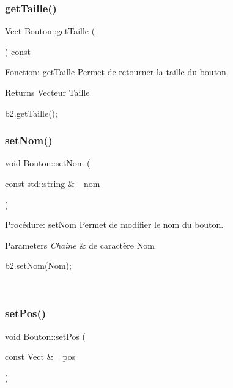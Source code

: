 \subsubsection{\texorpdfstring{get\+Taille()}{getTaille()}}
{\footnotesize\ttfamily \hyperlink{classVect}{Vect} Bouton\+::get\+Taille (\begin{DoxyParamCaption}{ }\end{DoxyParamCaption}) const}



Fonction\+: get\+Taille Permet de retourner la taille du bouton. 

\begin{DoxyReturn}{Returns}
Vecteur Taille 
\begin{DoxyCode}
b2.getTaille();
\end{DoxyCode}
 
\end{DoxyReturn}
\mbox{\label{classBouton_a4bdd74233fa0a3f6fe67d463b75d3f4a}} 
\subsubsection{\texorpdfstring{set\+Nom()}{setNom()}}
{\footnotesize\ttfamily void Bouton\+::set\+Nom (\begin{DoxyParamCaption}\item[{const std\+::string \&}]{\+\_\+nom }\end{DoxyParamCaption})}



Procédure\+: set\+Nom Permet de modifier le nom du bouton. 


\begin{DoxyParams}{Parameters}
{\em Chaîne} & de caractère Nom 
\begin{DoxyCode}
b2.setNom(Nom);
\end{DoxyCode}
 \\
\hline
\end{DoxyParams}
\mbox{\label{classBouton_a393e195ff7d1ff7a5d3c79edc922b0cd}} 
\subsubsection{\texorpdfstring{set\+Pos()}{setPos()}}
{\footnotesize\ttfamily void Bouton\+::set\+Pos (\begin{DoxyParamCaption}\item[{const \hyperlink{classVect}{Vect} \&}]{\+\_\+pos }\end{DoxyParamCaption})}



